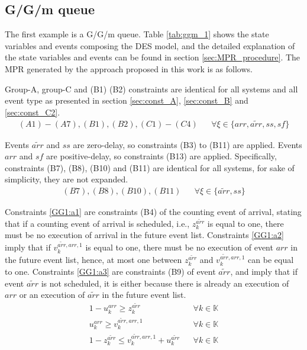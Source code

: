 \documentclass[]{interact}
\theoremstyle{plain}%
\theoremstyle{definition}
\theoremstyle{remark}
\begin{document}
\subsection{G/G/m queue}\label{sec:ggm}
The first example is a G/G/m queue. Table \ref{tab:ggm_1} shows the state variables and events composing the DES model, and the detailed explanation of the state variables and events can be found in section \ref{sec:MPR_procedure}. The MPR generated by the approach proposed in this work is as follows.

Group-A, group-C and (B1) (B2) constraints are identical for all systems and all event type as presented in section \ref{sec:const_A},  \ref{sec:const_B} and \ref{sec:const_C2}.
\begin{eqnarray}
(A1)-(A7),(B1),(B2),(C1)-(C4)&& \forall \xi \in\{arr,\tilde{arr},ss,sf\}\nonumber
\end{eqnarray}

 Events ${\tilde{arr}}$ and ${ss}$ are zero-delay, so constraints (B3) to (B11) are applied. Events ${arr}$ and ${sf}$ are positive-delay, so constraints (B13) are applied. Specifically, constraints  (B7), (B8), (B10) and (B11) are identical for all systems, for sake of simplicity, they are not expanded. 
 \begin{eqnarray}
 (B7),(B8),(B10),(B11)&& \forall \xi \in\{\tilde{arr},ss\}\nonumber
 \end{eqnarray}
 
 Constraints \eqref{GG1:a1} are constraints (B4) of the counting event of arrival, stating that if a counting event of arrival is scheduled, i.e., $z^{\tilde{arr}}_{k}$ is equal to one, there must be no execution of arrival in the future event list. Constraints \eqref{GG1:a2} imply that if $v^{\tilde{arr},arr,1}_k$ is equal to one, there must be no execution of event ${arr}$ in the future event list, hence, at most one between $z^{\tilde{arr}}_{k}$ and $v^{\tilde{arr},arr,1}_k$ can be equal to one. Constraints \eqref{GG1:a3} are constraints (B9) of event ${\tilde{arr}}$, and imply that if event ${\tilde{arr}}$ is not scheduled, it is either because there is already an execution of ${arr}$ or an execution of ${\tilde{arr}}$ in the future event list. 
 \begin{eqnarray}
 1-u^{arr}_{k} \ge z^{\tilde{arr}}_{k} &&\forall k\in \mathbb{K} \label{GG1:a1}\\
 u^{arr}_{k} \ge v^{\tilde{arr},arr,1}_k &&\forall k\in \mathbb{K} \label{GG1:a2}\\
 1-z^{\tilde{arr}}_{k}\le  v^{\tilde{arr},arr,1}_k +u^{\tilde{arr}}_k&&\forall k\in \mathbb{K}\label{GG1:a3}
 \end{eqnarray}
 
\end{document}
